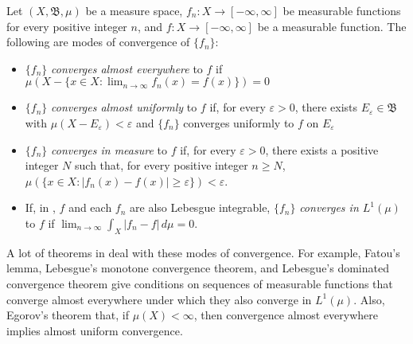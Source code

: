 \documentclass[12pt]{article}
\begin{document}

Let $(X,\mathfrak{B},\mu)$ be a measure space, $f_n \colon X \to [-\infty, \infty]$ be measurable functions for every positive integer $n$, and $f \colon X \to [-\infty, \infty]$ be a measurable function.  The following are modes of convergence of $\{f_n\}$:

\begin{itemize}

\item $\{f_n\}$ \emph{converges almost everywhere} to $f$ if $\displaystyle \mu \left( X-\{x \in X: \lim_{n \to \infty} f_n(x)=f(x)\} \right)=0$

\item $\{f_n\}$ \emph{converges almost uniformly} to $f$ if, for every $\varepsilon >0$, there exists $E_\varepsilon \in \mathfrak{B}$ with $\mu (X-E_\varepsilon) <\varepsilon$ and $\{f_n\}$ converges uniformly to $f$ on $E_\varepsilon$

\item $\{f_n\}$ \emph{converges in measure} to $f$ if, for every $\varepsilon >0$, there exists a positive integer $N$ such that, for every positive integer $n \ge N$, $\displaystyle \mu \left( \{ x \in X:|f_n(x)-f(x)|\ge \varepsilon \} \right)<\varepsilon$.

\item If, in , $f$ and each $f_n$ are also Lebesgue integrable, $\{f_n\}$ \emph{converges in $L^1(\mu)$} to $f$ if $\displaystyle \lim_{n \to \infty} \int_X \left| f_n-f \right| \, d\mu =0$.

\end{itemize}

A lot of theorems in  deal with these modes of convergence.  For example, Fatou's lemma, Lebesgue's monotone convergence theorem, and Lebesgue's dominated convergence theorem give conditions on sequences of measurable functions that converge almost everywhere under which they also converge in $L^1(\mu)$.  Also, Egorov's theorem  that, if $\mu(X)<\infty$, then convergence almost everywhere implies almost uniform convergence.
\end{document}
